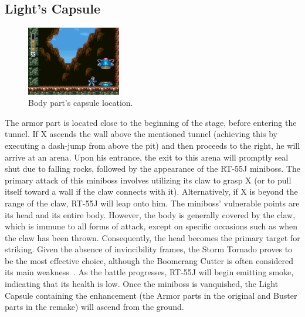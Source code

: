 \subsection{Light's Capsule}
\begin{figure}[htp]
	\centering
	\includegraphics[height=3cm]{figures/X1/Sting_chameleon/Sting_armor_capsule.jpg}
	\caption{Body part's capsule location.}
\end{figure}
The armor part is located close to the beginning of the stage, before entering the tunnel. If X ascends the wall above the mentioned tunnel (achieving this by executing a dash-jump from above the pit) and then proceeds to the right, he will arrive at an arena. Upon his entrance, the exit to this arena will promptly seal shut due to falling rocks,  followed by the appearance of the RT-55J miniboss. The primary attack of this miniboss involves utilizing its claw to grasp X (or to pull itself toward a wall if the claw connects with it). Alternatively, if X is beyond the range of the claw, RT-55J will leap onto him. The miniboss' vulnerable points are its head and its entire body. However, the body is generally covered by the claw, which is immune to all forms of attack, except on specific occasions such as when the claw has been thrown. Consequently, the head becomes the primary target for striking. Given the absence of invincibility frames, the Storm Tornado proves to be the most effective choice, although the Boomerang Cutter is often considered its main weakness~\cite{wiki:RT55J}. As the battle progresses, RT-55J will begin emitting smoke, indicating that its health is low. Once the miniboss is vanquished, the Light Capsule containing the enhancement (the Armor parts in the original and Buster parts in the remake) will ascend from the ground.

